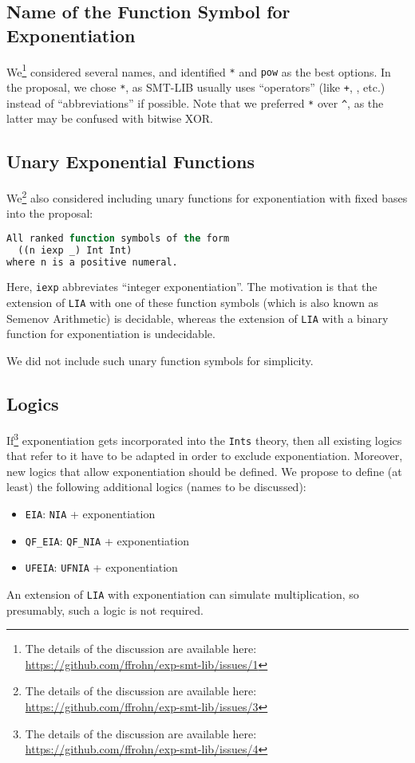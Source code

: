 \documentclass{article}
\begin{document}
\subsection{Name of the Function Symbol for Exponentiation}

We\footnote{The details of the discussion are available here: \url{https://github.com/ffrohn/exp-smt-lib/issues/1}} considered several names, and identified {\tt **} and {\tt pow} as the best options.
%
In the proposal, we chose {\tt **}, as SMT-LIB usually uses ``operators'' (like {\tt +}, {\tt *}, etc.) instead of ``abbreviations'' if possible.
%
Note that we preferred {\tt **} over {\tt \^{}}, as the latter may be confused with bitwise XOR.

\subsection{Unary Exponential Functions}

We\footnote{The details of the discussion are available here: \url{https://github.com/ffrohn/exp-smt-lib/issues/3}} also considered including unary functions for exponentiation with fixed bases into the proposal:
%
\begin{lstlisting}[language=Lisp]
All ranked function symbols of the form
  ((n iexp _) Int Int)
where n is a positive numeral.
\end{lstlisting}
%
Here, \lstinline{iexp} abbreviates ``integer exponentiation''.
%
The motivation is that the extension of {\tt LIA} with one of these function symbols (which is also known as Semenov Arithmetic) is decidable, whereas the extension of {\tt LIA} with a binary function for exponentiation is undecidable.

We did not include such unary function symbols for simplicity.

\subsection{Logics}

If\footnote{The details of the discussion are available here: \url{https://github.com/ffrohn/exp-smt-lib/issues/4}} exponentiation gets incorporated into the {\tt Ints} theory, then all existing logics that refer to it have to be adapted in order to exclude exponentiation.
%
Moreover, new logics that allow exponentiation should be defined.
%
We propose to define (at least) the following additional logics (names to be discussed):
%
\begin{itemize}
\item {\tt EIA}: {\tt NIA} + exponentiation
\item {\tt QF\_EIA}: {\tt QF\_NIA} + exponentiation
\item {\tt UFEIA}: {\tt UFNIA} + exponentiation
\end{itemize}
%
An extension of {\tt LIA} with exponentiation can simulate multiplication, so presumably, such a logic is not required.


\end{document}
